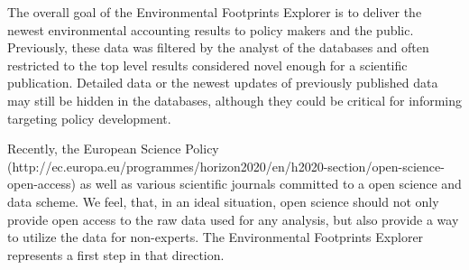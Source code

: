 The overall goal of the Environmental Footprints Explorer is to deliver the newest environmental accounting results to policy makers and the public. Previously, these data was filtered by the analyst of the databases and often restricted to the top level results considered novel enough for a scientific publication. Detailed data or the newest updates of previously published data may still be hidden in the databases, although they could be critical for informing targeting policy development.

Recently, the European Science Policy (http://ec.europa.eu/programmes/horizon2020/en/h2020-section/open-science-open-access) as well as various scientific journals \cite{Hanson_2011, Stodden_2012, Boulton_2012} committed to a open science and data scheme. We feel, that, in an ideal situation, open science should not only provide open access to the raw data used for any analysis, but also provide a way to utilize the data for non-experts. The Environmental Footprints Explorer represents a first step in that direction.